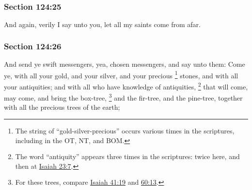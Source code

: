 
	\subsubsection{Section 124:25} %
		\label{DC124-25}

		And again, verily I say unto you, let all my saints come from afar.


	\subsubsection{Section 124:26} %
		\label{DC124-26}

		And send ye swift messengers, yea, chosen messengers, and say unto them: Come ye, with all your gold, and your silver, and your precious%
			\footnote{%
				The string of ``gold-silver-precious'' occurs various times in the scriptures, including in the OT, NT, and BOM.
				}
		stones, and with all your antiquities; and with all who have knowledge of antiquities,%
			\footnote{%
				The word ``antiquity'' appears three times in the scriptures: twice here, and then at \hyperref[ISAIAH-23-7]{Isaiah 23:7}.
				}
		that will come, may come, and bring the box-tree,%
			\footnote{%
				For these trees, compare \hyperref[ISAIAH-41-19]{Isaiah 41:19} and \hyperref[ISAIAH-60-13]{60:13}.
				}
		and the fir-tree, and the pine-tree, together with all the precious trees of the earth;


